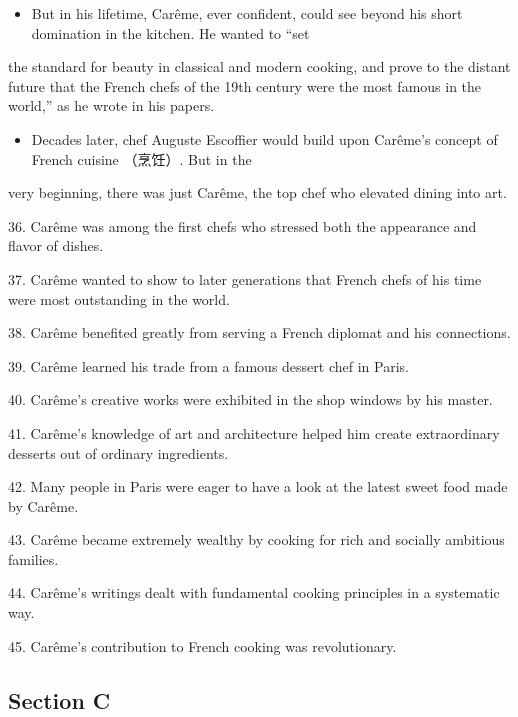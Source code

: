 \documentclass[UTF8,11pt]{ctexart}
\begin{document}
\begin{itemize}[leftmargin=2em,itemsep=.2em,topsep=.4em]\item[M.] But in his lifetime, Carême, ever confident, could see beyond his short domination in the kitchen. He wanted to “set
\end{itemize}

the standard for beauty in classical and modern cooking, and prove to the distant future that the French chefs of the 19th century were the most famous in the world,” as he wrote in his papers.


\begin{itemize}[leftmargin=2em,itemsep=.2em,topsep=.4em]\item[N.] Decades later, chef Auguste Escoffier would build upon Carême's concept of French cuisine （烹饪）. But in the
\end{itemize}

very beginning, there was just Carême, the top chef who elevated dining into art.


36. Carême was among the first chefs who stressed both the appearance and flavor of dishes.


37. Carême wanted to show to later generations that French chefs of his time were most outstanding in the world.


38. Carême benefited greatly from serving a French diplomat and his connections.


39. Carême learned his trade from a famous dessert chef in Paris.


40. Carême's creative works were exhibited in the shop windows by his master.


41. Carême's knowledge of art and architecture helped him create extraordinary desserts out of ordinary ingredients.


42. Many people in Paris were eager to have a look at the latest sweet food made by Carême.


43. Carême became extremely wealthy by cooking for rich and socially ambitious families.


44. Carême's writings dealt with fundamental cooking principles in a systematic way.


45. Carême's contribution to French cooking was revolutionary.


\subsection*{\textbf{Section C}}
\end{document}
